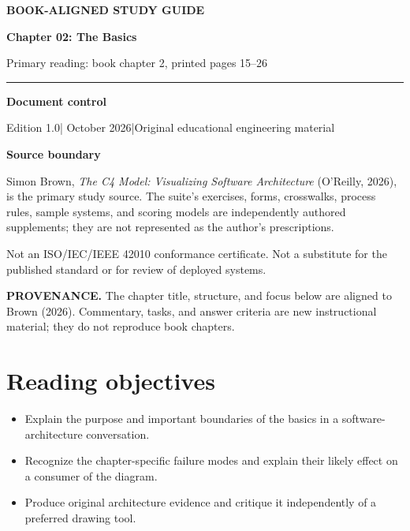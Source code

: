 \documentclass[10pt,letterpaper]{article}
\newcommand{\SourceNote}[1]{\par\smallskip\noindent\colorbox{C4Light}{\parbox{0.94\linewidth}{\footnotesize\textbf{PROVENANCE.} #1}}\par\medskip}
\newcommand{\DocStart}[3]{%
\begin{document}
\begin{titlepage}
\renewcommand{\thepage}{title-\arabic{page}}
\vspace*{0.55in}
{\sffamily\bfseries\small\color{C4Teal}#1}\par\vspace{0.24in}
{\sffamily\bfseries\fontsize{26}{31}\selectfont\color{C4Navy}#2}\par\vspace{0.18in}
{\large\color{C4Gray}#3}\par\vspace{0.4in}
\textcolor{C4Teal}{\rule{\linewidth}{1.15pt}}\par\vspace{0.24in}
\textbf{Document control}\par
Edition 1.0\quad|\quad 30 October 2026\quad|\quad Original educational engineering material\par
\vspace{0.17in}
\textbf{Source boundary}\par
Simon Brown, \emph{The C4 Model: Visualizing Software Architecture} (O'Reilly, 2026), is the primary study source. The suite's exercises, forms, crosswalks, process rules, sample systems, and scoring models are independently authored supplements; they are not represented as the author's prescriptions.\par
\vfill
{\small\color{C4Gray}Not an ISO/IEC/IEEE 42010 conformance certificate. Not a substitute for the published standard or for review of deployed systems.}\par
\end{titlepage}
}
\DocStart{BOOK-ALIGNED STUDY GUIDE}{Chapter 02: The Basics}{Primary reading: book chapter 2, printed pages 15–26}
\SourceNote{The chapter title, structure, and focus below are aligned to Brown (2026). Commentary, tasks, and answer criteria are new instructional material; they do not reproduce book chapters.}
\section{Reading objectives}
\begin{itemize}
\item Explain the purpose and important boundaries of the basics in a software-architecture conversation.
\item Recognize the chapter-specific failure modes and explain their likely effect on a consumer of the diagram.
\item Produce original architecture evidence and critique it independently of a preferred drawing tool.
\end{itemize}
\end{document}
